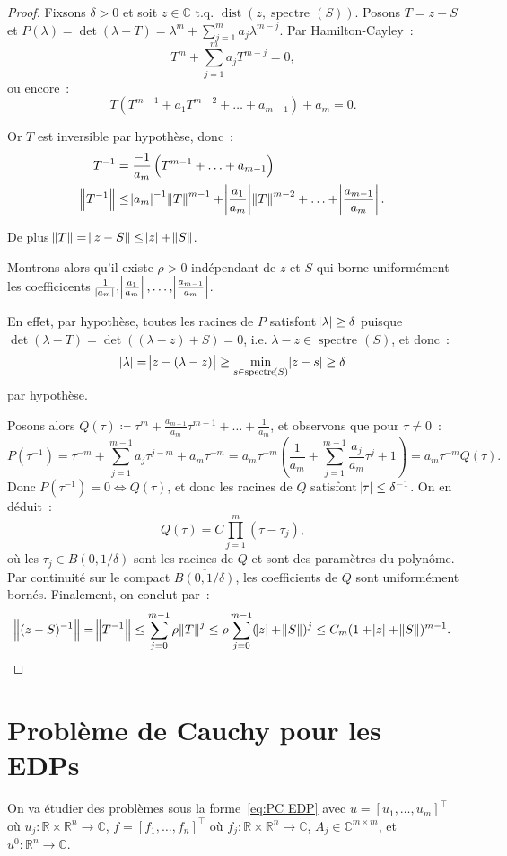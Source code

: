 \documentclass{report}
\DeclareMathOperator{\spectreOperator}{spectre\!}
\DeclareMathOperator{\dist}{dist}
\newcommand{\C}{{\mathbb C}}
\newcommand{\R}{{\mathbb R}}
\newcommand{\tq}{\text{ t.q. }}
\newcommand{\st}{\tq}
\newcommand{\spectre}[1]{{\spectreOperator\left(#1\right)}}
\theoremstyle{definition}
\theoremstyle{remark}
\begin{document}
\begin{proof} Fixsons $\delta > 0$ et soit $z \in \C \st \dist(z, \spectre S)$. Posons $T = z-S$ et $P(\lambda) = \det(\lambda - T) = \lambda^m + \sum_{j=1}^ma_j\lambda^{m-j}$.
Par Hamilton-Cayley~:
\[T^m + \sum_{j=1}^ma_jT^{m-j} = 0,\]
ou encore~:
\[T\left(T^{m-1} + a_1T^{m-2} + \ldots + a_{m-1}\right) + a_m = 0.\]

Or $T$ est inversible par hypothèse, donc~:
\begin{align*}
	T^{-1} &= \frac {-1}{a_m}\left(T^{m-1} + \ldots + a_{m-1}\right) \\
	\norm {T^{-1}} &\leq \abs {a_m}^{-1}\norm T^{m-1} + \abs {\frac {a_1}{a_m}}\norm T^{m-2} + \ldots + \abs {\frac {a_{m-1}}{a_m}}.
\end{align*}

De plus $\norm T = \norm {z-S} \leq \abs z + \norm S$.

Montrons alors qu'il existe $\rho > 0$ indépendant de $z$ et $S$ qui borne uniformément les coefficicents
$\frac 1{\abs {a_m}}, \abs {\frac {a_1}{a_m}}, \ldots, \abs {\frac {a_{m-1}}{a_m}}$.

En effet, par hypothèse, toutes les racines de $P$ satisfont $\abs \lambda \geq \delta$ puisque $\det(\lambda - T) = \det((\lambda-z) + S) = 0$, i.e. $\lambda-z \in \spectre S$,
et donc~:
\[\abs \lambda = \abs {z-(\lambda-z)} \geq \min_{s \in \spectre S}\abs {z-s} \geq \delta\]
par hypothèse.

Posons alors $Q(\tau) \coloneqq \tau^m + \frac {a_{m-1}}{a_m}\tau^{m-1} + \ldots + \frac 1{a_m}$, et observons que pour $\tau \neq 0$~:
\[P(\tau^{-1}) = \tau^{-m}+\sum_{j=1}^{m-1}a_j\tau^{j-m} + a_m\tau^{-m} = a_m\tau^{-m}\left(\frac 1{a_m} + \sum_{j=1}^{m-1}\frac {a_j}{a_m}\tau^j + 1\right) = a_m\tau^{-m}Q(\tau).\]
Donc $P(\tau^{-1}) = 0 \iff Q(\tau)$, et donc les racines de $Q$ satisfont $\abs \tau \leq \delta^{-1}$. On en déduit~:
\[Q(\tau) = C\prod_{j=1}^m(\tau-\tau_j),\]
où les $\tau_j \in \overline {B(0, 1/\delta)}$ sont les racines de $Q$ et sont des paramètres du polynôme. Par continuité sur le compact $\overline {B(0, 1/\delta)}$,
les coefficients de $Q$ sont uniformément bornés. Finalement, on conclut par~:
\[\norm {(z-S)^{-1}} = \norm {T^{-1}} \leq \sum_{j=0}^{m-1}\rho\norm T^j \leq \rho\sum_{j=0}^{m-1}(\abs z + \norm S)^j \leq C_m(1+\abs z + \norm S)^{m-1}.\]
\end{proof}

\section{Problème de Cauchy pour les EDPs}
On va étudier des problèmes sous la forme~\eqref{eq:PC EDP} avec $u = [u_1, \ldots, u_m]^\top$ où $u_j : \R \times \R^n \to \C$, $f = [f_1, \ldots, f_n]^\top$ où
$f_j : \R \times \R^n \to \C$, $A_j \in \C^{m \times m}$, et $u^0 : \R^n \to \C$.
\end{document}

